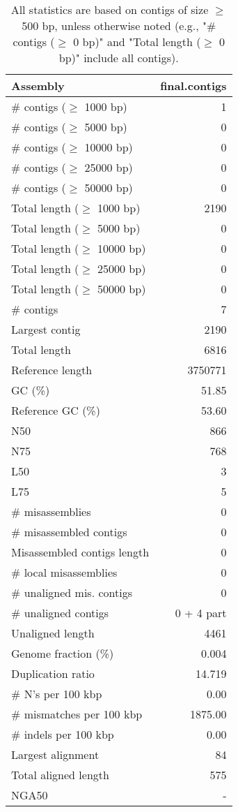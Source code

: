 \documentclass[12pt,a4paper]{article}
\begin{document}
\begin{table}[ht]
\begin{center}
\caption{All statistics are based on contigs of size $\geq$ 500 bp, unless otherwise noted (e.g., "\# contigs ($\geq$ 0 bp)" and "Total length ($\geq$ 0 bp)" include all contigs).}
\begin{tabular}{|l*{1}{|r}|}
\hline
Assembly & final.contigs \\ \hline
\# contigs ($\geq$ 1000 bp) & 1 \\ \hline
\# contigs ($\geq$ 5000 bp) & 0 \\ \hline
\# contigs ($\geq$ 10000 bp) & 0 \\ \hline
\# contigs ($\geq$ 25000 bp) & 0 \\ \hline
\# contigs ($\geq$ 50000 bp) & 0 \\ \hline
Total length ($\geq$ 1000 bp) & 2190 \\ \hline
Total length ($\geq$ 5000 bp) & 0 \\ \hline
Total length ($\geq$ 10000 bp) & 0 \\ \hline
Total length ($\geq$ 25000 bp) & 0 \\ \hline
Total length ($\geq$ 50000 bp) & 0 \\ \hline
\# contigs & 7 \\ \hline
Largest contig & 2190 \\ \hline
Total length & 6816 \\ \hline
Reference length & 3750771 \\ \hline
GC (\%) & 51.85 \\ \hline
Reference GC (\%) & 53.60 \\ \hline
N50 & 866 \\ \hline
N75 & 768 \\ \hline
L50 & 3 \\ \hline
L75 & 5 \\ \hline
\# misassemblies & 0 \\ \hline
\# misassembled contigs & 0 \\ \hline
Misassembled contigs length & 0 \\ \hline
\# local misassemblies & 0 \\ \hline
\# unaligned mis. contigs & 0 \\ \hline
\# unaligned contigs & 0 + 4 part \\ \hline
Unaligned length & 4461 \\ \hline
Genome fraction (\%) & 0.004 \\ \hline
Duplication ratio & 14.719 \\ \hline
\# N's per 100 kbp & 0.00 \\ \hline
\# mismatches per 100 kbp & 1875.00 \\ \hline
\# indels per 100 kbp & 0.00 \\ \hline
Largest alignment & 84 \\ \hline
Total aligned length & 575 \\ \hline
NGA50 & - \\ \hline
\end{tabular}
\end{center}
\end{table}
\end{document}
